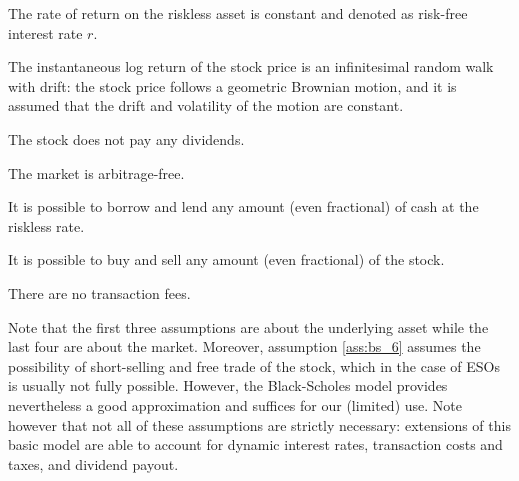     \begin{assumption}
        \label{ass:bs_1}
        The rate of return on the riskless asset is constant and denoted as risk-free interest rate $r$.
    \end{assumption}
    

    \begin{assumption}
        \label{ass: bs_2}
        The instantaneous log return of the stock price is an infinitesimal random walk with drift: the stock price follows a geometric Brownian motion, and it is assumed that the drift and volatility of the motion are constant.
    \end{assumption}

    \begin{assumption}
        \label{ass:bs_3}
        The stock does not pay any dividends.
    \end{assumption}

    \begin{assumption}
        \label{ass:bs_4}
        The market is arbitrage-free.
    \end{assumption}

    \begin{assumption}
        \label{ass:bs_5}
        It is possible to borrow and lend any amount (even fractional) of cash at the riskless rate.
    \end{assumption}

    \begin{assumption}
        \label{ass:bs_6}
        It is possible to buy and sell any amount (even fractional) of the stock.
    \end{assumption}
    
    \begin{assumption}
        \label{ass:bs_7}
        There are no transaction fees.
    \end{assumption}
    
    Note that the first three assumptions are about the underlying asset while the last four are about the market. Moreover, assumption \ref*{ass:bs_6} assumes the possibility of short-selling and free trade of the stock, which in the case of ESOs is usually not fully possible. However, the Black-Scholes model provides nevertheless a good approximation and suffices for our (limited) use. Note however that not all of these assumptions are strictly necessary: extensions of this basic model are able to account for dynamic interest rates, transaction costs and taxes, and dividend payout.  

